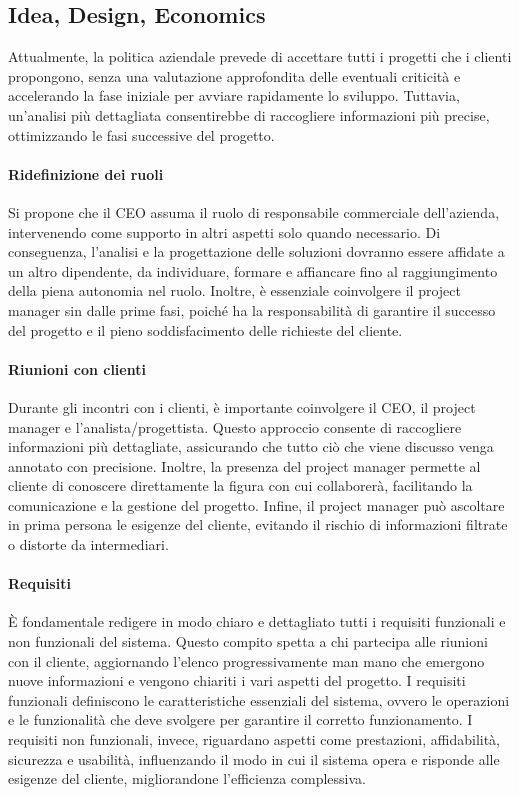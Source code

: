     \subsection{Idea, Design, Economics}
    Attualmente, la politica aziendale prevede di accettare tutti i progetti che i clienti propongono,
    senza una valutazione approfondita delle eventuali
    criticità e accelerando la fase iniziale per avviare rapidamente lo sviluppo. Tuttavia, un'analisi più dettagliata
    consentirebbe di raccogliere informazioni più precise, ottimizzando le fasi successive del progetto.

        \paragraph{Ridefinizione dei ruoli}
        Si propone che il CEO assuma il ruolo di responsabile commerciale dell’azienda, intervenendo come supporto in altri aspetti
        solo quando necessario. Di conseguenza, l’analisi e la progettazione delle soluzioni dovranno essere affidate a un altro
        dipendente, da individuare, formare e affiancare fino al raggiungimento della piena autonomia nel ruolo. Inoltre, è
        essenziale coinvolgere il project manager sin dalle prime fasi, poiché ha la responsabilità di garantire il successo
        del progetto e il pieno soddisfacimento delle richieste del cliente.

        \paragraph{Riunioni con clienti}
        Durante gli incontri con i clienti, è importante coinvolgere il CEO, il project manager e l'analista/progettista.
        Questo approccio consente di raccogliere informazioni più dettagliate, assicurando che tutto ciò che viene discusso
        venga annotato con precisione. Inoltre, la presenza del project manager permette al cliente di conoscere direttamente
        la figura con cui collaborerà, facilitando la comunicazione e la gestione del progetto. Infine, il project manager
        può ascoltare in prima persona le esigenze del cliente, evitando il rischio di informazioni filtrate o distorte da intermediari.

        \paragraph{Requisiti}
        È fondamentale redigere in modo chiaro e dettagliato tutti i requisiti funzionali e non funzionali del sistema. Questo
        compito spetta a chi partecipa alle riunioni con il cliente, aggiornando l’elenco progressivamente man mano che emergono
        nuove informazioni e vengono chiariti i vari aspetti del progetto.
        I requisiti funzionali definiscono le caratteristiche essenziali del sistema, ovvero le operazioni e le funzionalità che
        deve svolgere per garantire il corretto funzionamento.
        I requisiti non funzionali, invece, riguardano aspetti come prestazioni, affidabilità, sicurezza e usabilità,
        influenzando il modo in cui il sistema opera e risponde alle esigenze del cliente, migliorandone l’efficienza complessiva.

